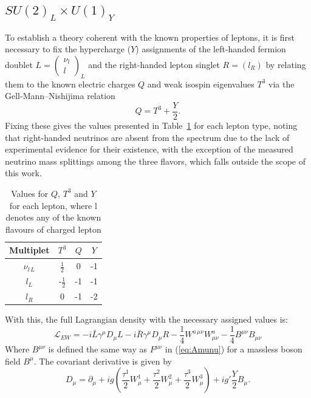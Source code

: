 \subsection{$SU(2)_L \times U(1)_Y$}
To establish a theory coherent with the known properties of leptons, it is first necessary to fix the hypercharge ($Y$) assignments of the left-handed fermion doublet $L = \left(\begin{smallmatrix}\nu_l \\ l\end{smallmatrix}\right)_L$ and the right-handed lepton singlet $R = (l_R)$ by relating them to the known electric charges $Q$ and weak isospin eigenvalues $T^3$ via the Gell-Mann--Nishijima relation
\begin{equation}\label{eq:Gell-Mann-Nishijima}
  Q = T^3 + \frac{Y}{2}.
\end{equation}
Fixing these gives the values presented in Table~\ref{tb:QT3Y} for each lepton type, noting that right-handed neutrinos are absent from the spectrum due to the lack of experimental evidence for their existence, with the exception of the measured neutrino mass splittings among the three flavors, which falls outside the scope of this work.
\begin{table}\centering
\begin{tabular*}{0.8\linewidth}{@{\extracolsep{\fill}} cccc }
\toprule
Multiplet  &   $T^3$   & $Q$  & $Y$  \\ \midrule
$\nu_{l\,L}$ & $\frac{1}{2}$ &  0  & -1  \\
$l_L$    & -$\frac{1}{2}$ & -1  & -1  \\
$l_R$    &   0     & -1  & -2  \\ \bottomrule
\end{tabular*}
\caption{Values for $Q$, $T^3$ and $Y$ for each lepton, where l denotes any of the known flavours of charged lepton}
\label{tb:QT3Y}
\end{table}With this, the full Lagrangian density with the necessary assigned values is:
\begin{equation}\label{eq:L_EW}
  \mathcal{L}_{EW} = -i \bar{L} \gamma^{\mu} D_{\mu} L - i \bar R \gamma^{\mu} D_{\mu} R -\frac{1}{4}W^{a\,\mu\nu}W^{a}_{\mu\nu} -\frac{1}{4}B^{\mu\nu}B_{\mu\nu}
\end{equation}
Where $B^{\mu \nu}$ is defined the same way as $F^{\mu \nu}$ in (\ref{eq:Amunu}) for a massless boson field $B^\mu$. The covariant derivative is given by
\begin{equation}
  D_\mu = \partial_\mu + ig(\frac{\tau^1}{2}W^1_\mu + \frac{\tau^2}{2}W^2_\mu + \frac{\tau^3}{2}W^3_\mu) + ig'\frac{Y}{2}B_\mu.
\end{equation}
